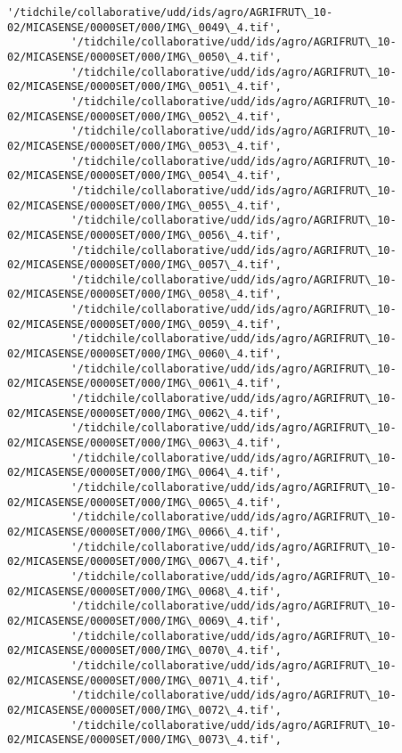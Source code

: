 \documentclass[11pt]{article}
\begin{document}
\begin{Verbatim}[commandchars=\\\{\}]
          '/tidchile/collaborative/udd/ids/agro/AGRIFRUT\_10-02/MICASENSE/0000SET/000/IMG\_0049\_4.tif',
          '/tidchile/collaborative/udd/ids/agro/AGRIFRUT\_10-02/MICASENSE/0000SET/000/IMG\_0050\_4.tif',
          '/tidchile/collaborative/udd/ids/agro/AGRIFRUT\_10-02/MICASENSE/0000SET/000/IMG\_0051\_4.tif',
          '/tidchile/collaborative/udd/ids/agro/AGRIFRUT\_10-02/MICASENSE/0000SET/000/IMG\_0052\_4.tif',
          '/tidchile/collaborative/udd/ids/agro/AGRIFRUT\_10-02/MICASENSE/0000SET/000/IMG\_0053\_4.tif',
          '/tidchile/collaborative/udd/ids/agro/AGRIFRUT\_10-02/MICASENSE/0000SET/000/IMG\_0054\_4.tif',
          '/tidchile/collaborative/udd/ids/agro/AGRIFRUT\_10-02/MICASENSE/0000SET/000/IMG\_0055\_4.tif',
          '/tidchile/collaborative/udd/ids/agro/AGRIFRUT\_10-02/MICASENSE/0000SET/000/IMG\_0056\_4.tif',
          '/tidchile/collaborative/udd/ids/agro/AGRIFRUT\_10-02/MICASENSE/0000SET/000/IMG\_0057\_4.tif',
          '/tidchile/collaborative/udd/ids/agro/AGRIFRUT\_10-02/MICASENSE/0000SET/000/IMG\_0058\_4.tif',
          '/tidchile/collaborative/udd/ids/agro/AGRIFRUT\_10-02/MICASENSE/0000SET/000/IMG\_0059\_4.tif',
          '/tidchile/collaborative/udd/ids/agro/AGRIFRUT\_10-02/MICASENSE/0000SET/000/IMG\_0060\_4.tif',
          '/tidchile/collaborative/udd/ids/agro/AGRIFRUT\_10-02/MICASENSE/0000SET/000/IMG\_0061\_4.tif',
          '/tidchile/collaborative/udd/ids/agro/AGRIFRUT\_10-02/MICASENSE/0000SET/000/IMG\_0062\_4.tif',
          '/tidchile/collaborative/udd/ids/agro/AGRIFRUT\_10-02/MICASENSE/0000SET/000/IMG\_0063\_4.tif',
          '/tidchile/collaborative/udd/ids/agro/AGRIFRUT\_10-02/MICASENSE/0000SET/000/IMG\_0064\_4.tif',
          '/tidchile/collaborative/udd/ids/agro/AGRIFRUT\_10-02/MICASENSE/0000SET/000/IMG\_0065\_4.tif',
          '/tidchile/collaborative/udd/ids/agro/AGRIFRUT\_10-02/MICASENSE/0000SET/000/IMG\_0066\_4.tif',
          '/tidchile/collaborative/udd/ids/agro/AGRIFRUT\_10-02/MICASENSE/0000SET/000/IMG\_0067\_4.tif',
          '/tidchile/collaborative/udd/ids/agro/AGRIFRUT\_10-02/MICASENSE/0000SET/000/IMG\_0068\_4.tif',
          '/tidchile/collaborative/udd/ids/agro/AGRIFRUT\_10-02/MICASENSE/0000SET/000/IMG\_0069\_4.tif',
          '/tidchile/collaborative/udd/ids/agro/AGRIFRUT\_10-02/MICASENSE/0000SET/000/IMG\_0070\_4.tif',
          '/tidchile/collaborative/udd/ids/agro/AGRIFRUT\_10-02/MICASENSE/0000SET/000/IMG\_0071\_4.tif',
          '/tidchile/collaborative/udd/ids/agro/AGRIFRUT\_10-02/MICASENSE/0000SET/000/IMG\_0072\_4.tif',
          '/tidchile/collaborative/udd/ids/agro/AGRIFRUT\_10-02/MICASENSE/0000SET/000/IMG\_0073\_4.tif',

\end{Verbatim}
\end{document}
